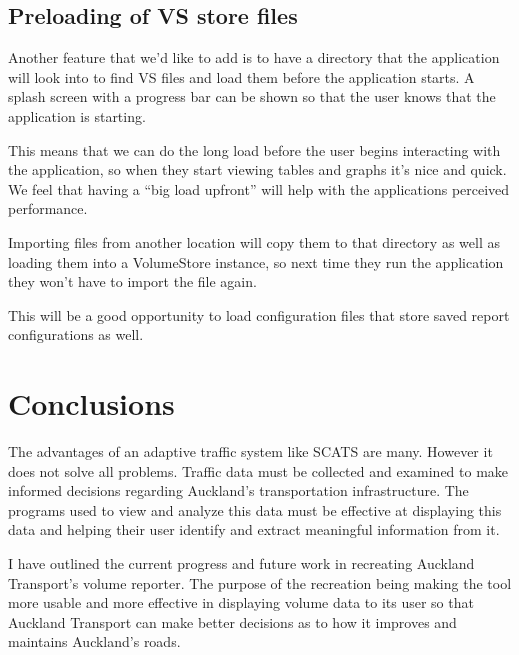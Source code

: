 \documentclass{article}
\begin{document}
\subsection{Preloading of VS store files}
Another feature that we’d like to add is to have a directory
that the application will look into to find VS files and load
them before the application starts. A splash screen with a
progress bar can be shown so that the user knows that the
application is starting.

This means that we can do the long load before the user
begins interacting with the application, so when they start
viewing tables and graphs it’s nice and quick. We feel that
having a “big load upfront” will help with the applications
perceived performance.

Importing files from another location will copy them to that
directory as well as loading them into a VolumeStore instance,
so next time they run the application they won’t have to
import the file again.

This will be a good opportunity to load configuration files
that store saved report configurations as well.

\section{Conclusions}
The advantages of an adaptive traffic system like SCATS
are many. However it does not solve all problems. Traffic data
must be collected and examined to make informed decisions
regarding Auckland’s transportation infrastructure. The
programs used to view and analyze this data must be effective
at displaying this data and helping their user identify and
extract meaningful information from it.

I have outlined the current progress and future work in
recreating Auckland Transport’s volume reporter. The purpose
of the recreation being making the tool more usable and more
effective in displaying volume data to its user so that
Auckland Transport can make better decisions as to how it
improves and maintains Auckland’s roads.




\end{document}
